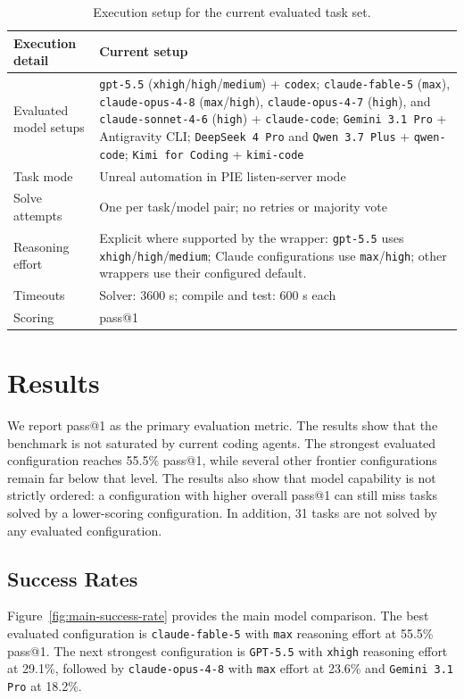 \documentclass[11pt]{article}
\begin{document}
\begin{table}[t]
\centering
\small
\setlength{\parindent}{0pt}
\setlength{\parskip}{0.6em}
\setlength{\tabcolsep}{5pt}
\begin{tabular}{@{}p{}p{}@{}}
\toprule
\textbf{Execution detail} & \textbf{Current setup} \\
\midrule
Evaluated model setups & \texttt{gpt-5.5} (\texttt{xhigh}/\texttt{high}/\texttt{medium}) + \texttt{codex}; \texttt{claude-fable-5} (\texttt{max}), \texttt{claude-opus-4-8} (\texttt{max}/\texttt{high}), \texttt{claude-opus-4-7} (\texttt{high}), and \texttt{claude-sonnet-4-6} (\texttt{high}) + \texttt{claude-code}; \texttt{Gemini 3.1 Pro} + Antigravity CLI; \texttt{DeepSeek 4 Pro} and \texttt{Qwen 3.7 Plus} + \texttt{qwen-code}; \texttt{Kimi for Coding} + \texttt{kimi-code} \\
Task mode & Unreal automation in PIE listen-server mode \\
Solve attempts & One per task/model pair; no retries or majority vote \\
Reasoning effort & Explicit where supported by the wrapper: \texttt{gpt-5.5} uses \texttt{xhigh}/\texttt{high}/\texttt{medium}; Claude configurations use \texttt{max}/\texttt{high}; other wrappers use their configured default. \\
Timeouts & Solver: 3600 s; compile and test: 600 s each \\
Scoring & pass@1 \\
\bottomrule
\end{tabular}
\caption{Execution setup for the current evaluated task set.}
\label{tab:execution-setup}
\end{table}

\FloatBarrier
\section{Results}
We report pass@1 as the primary evaluation metric. The results show that the benchmark is not saturated by current coding agents. The strongest evaluated configuration reaches 55.5\% pass@1, while several other frontier configurations remain far below that level. The results also show that model capability is not strictly ordered: a configuration with higher overall pass@1 can still miss tasks solved by a lower-scoring configuration. In addition, 31 tasks are not solved by any evaluated configuration.
\subsection{Success Rates}
Figure~\ref{fig:main-success-rate} provides the main model comparison. The best evaluated configuration is \texttt{claude-fable-5} with \texttt{max} reasoning effort at 55.5\% pass@1. The next strongest configuration is \texttt{GPT-5.5} with \texttt{xhigh} reasoning effort at 29.1\%, followed by \texttt{claude-opus-4-8} with \texttt{max} effort at 23.6\% and \texttt{Gemini 3.1 Pro} at 18.2\%.
\end{document}
